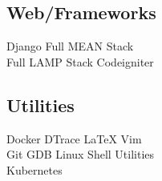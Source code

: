 \documentclass[]{deedy-resume-openfont}
\begin{document}
\begin{minipage}[t]{0.30\textwidth}
\subsection{Web/Frameworks}
Django \textbullet{} Full MEAN Stack \\
Full LAMP Stack \textbullet{} Codeigniter \\
\vspace{0.4 cm}
\subsection{Utilities}
Docker \textbullet{} DTrace \textbullet{} \LaTeX{} \textbullet{} Vim \\
Git \textbullet{} GDB \textbullet{} Linux Shell Utilities \\
Kubernetes 


%
%

\end{minipage}
\hfill
\end{document}

